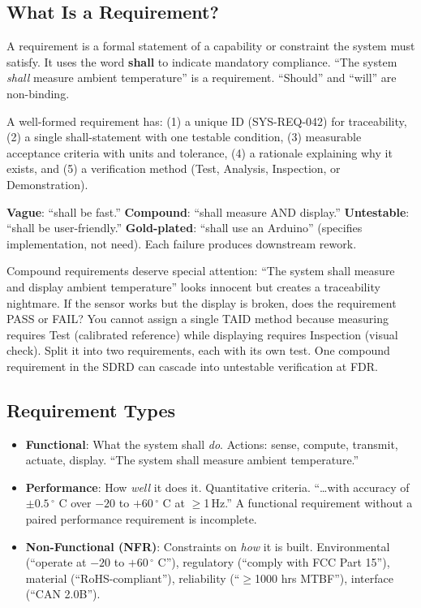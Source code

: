 \documentclass[11pt,letterpaper,twoside,openany]{book}
\begin{document}
\subsection{What Is a Requirement?}
A requirement is a formal statement of a capability or constraint the system must satisfy. It uses the word \textbf{shall} to indicate mandatory compliance. ``The system \emph{shall} measure ambient temperature'' is a requirement. ``Should'' and ``will'' are non-binding.

A well-formed requirement has: (1) a unique ID (SYS-REQ-042) for traceability, (2) a single shall-statement with one testable condition, (3) measurable acceptance criteria with units and tolerance, (4) a rationale explaining why it exists, and (5) a verification method (Test, Analysis, Inspection, or Demonstration).

\begin{warningbox}
\textbf{Vague}: ``shall be fast.'' \textbf{Compound}: ``shall measure AND display.'' \textbf{Untestable}: ``shall be user-friendly.'' \textbf{Gold-plated}: ``shall use an Arduino'' (specifies implementation, not need). Each failure produces downstream rework.

Compound requirements deserve special attention: ``The system shall measure and display ambient temperature'' looks innocent but creates a traceability nightmare. If the sensor works but the display is broken, does the requirement PASS or FAIL? You cannot assign a single TAID method because measuring requires Test (calibrated reference) while displaying requires Inspection (visual check). Split it into two requirements, each with its own test. One compound requirement in the SDRD can cascade into untestable verification at FDR.
\end{warningbox}

\subsection{Requirement Types}
\begin{itemize}[leftmargin=1.5em]
\item \textbf{Functional}: What the system shall \emph{do}. Actions: sense, compute, transmit, actuate, display. ``The system shall measure ambient temperature.''
\item \textbf{Performance}: How \emph{well} it does it. Quantitative criteria. ``\ldots with accuracy of $\pm 0.5$\,$^{\circ}$ C over $-20$ to $+60$\,$^{\circ}$ C at $\geq$1\,Hz.'' A functional requirement without a paired performance requirement is incomplete.
\item \textbf{Non-Functional (NFR)}: Constraints on \emph{how} it is built. Environmental (``operate at $-20$ to $+60$\,$^{\circ}$ C''), regulatory (``comply with FCC Part 15''), material (``RoHS-compliant''), reliability (``$\geq$1000 hrs MTBF''), interface (``CAN 2.0B'').
\end{itemize}
\end{document}
